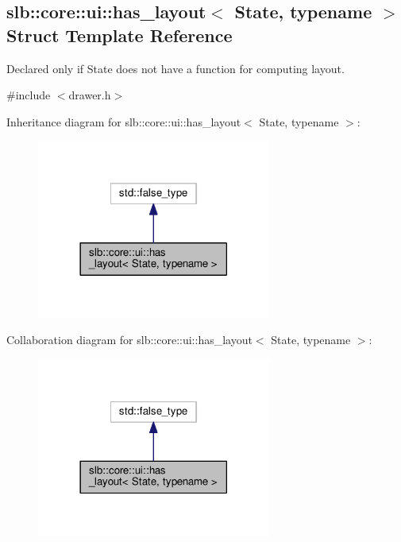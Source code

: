 \hypertarget{structslb_1_1core_1_1ui_1_1has__layout}{}\subsection{slb\+:\+:core\+:\+:ui\+:\+:has\+\_\+layout$<$ State, typename $>$ Struct Template Reference}
\label{structslb_1_1core_1_1ui_1_1has__layout}


Declared only if {\ttfamily State} does not have a function for computing layout.  




{\ttfamily \#include $<$drawer.\+h$>$}



Inheritance diagram for slb\+:\+:core\+:\+:ui\+:\+:has\+\_\+layout$<$ State, typename $>$\+:\nopagebreak
\begin{figure}[H]
\begin{center}
\leavevmode
\includegraphics[width=218pt]{structslb_1_1core_1_1ui_1_1has__layout__inherit__graph}
\end{center}
\end{figure}


Collaboration diagram for slb\+:\+:core\+:\+:ui\+:\+:has\+\_\+layout$<$ State, typename $>$\+:\nopagebreak
\begin{figure}[H]
\begin{center}
\leavevmode
\includegraphics[width=218pt]{structslb_1_1core_1_1ui_1_1has__layout__coll__graph}
\end{center}
\end{figure}


